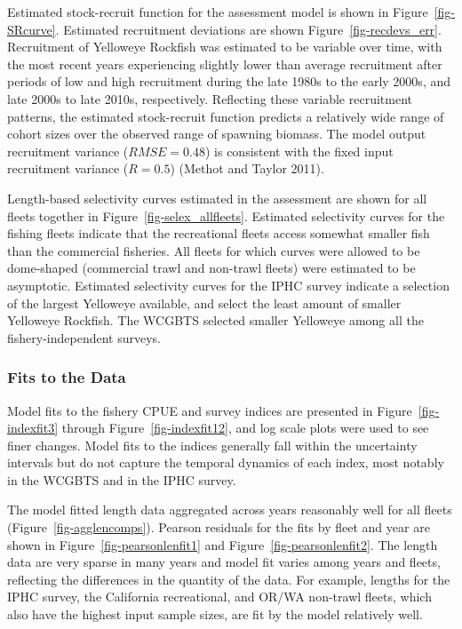 \documentclass[
  english,
]{article}
\begin{document}
Estimated stock-recruit function for the assessment model is shown in
Figure~\ref{fig-SRcurve}. Estimated recruitment deviations are shown
Figure~\ref{fig-recdevs_err}. Recruitment of Yelloweye Rockfish was
estimated to be variable over time, with the most recent years
experiencing slightly lower than average recruitment after periods of
low and high recruitment during the late 1980s to the early 2000s, and
late 2000s to late 2010s, respectively. Reflecting these variable
recruitment patterns, the estimated stock-recruit function predicts a
relatively wide range of cohort sizes over the observed range of
spawning biomass. The model output recruitment variance
(\(RMSE = 0.48\)) is consistent with the fixed input recruitment
variance (\(R = 0.5\)) (Methot and Taylor 2011).

Length-based selectivity curves estimated in the assessment are shown
for all fleets together in Figure~\ref{fig-selex_allfleets}. Estimated
selectivity curves for the fishing fleets indicate that the recreational
fleets access somewhat smaller fish than the commercial fisheries. All
fleets for which curves were allowed to be dome-shaped (commercial trawl
and non-trawl fleets) were estimated to be asymptotic. Estimated
selectivity curves for the IPHC survey indicate a selection of the
largest Yelloweye available, and select the least amount of smaller
Yelloweye Rockfish. The WCGBTS selected smaller Yelloweye among all the
fishery-independent surveys.

\subsubsection{Fits to the Data}\label{sec-fits}

Model fits to the fishery CPUE and survey indices are presented in
Figure~\ref{fig-indexfit3} through Figure~\ref{fig-indexfit12}, and log
scale plots were used to see finer changes. Model fits to the indices
generally fall within the uncertainty intervals but do not capture the
temporal dynamics of each index, most notably in the WCGBTS and in the
IPHC survey.

The model fitted length data aggregated across years reasonably well for
all fleets (Figure~\ref{fig-agglencomps}). Pearson residuals for the
fits by fleet and year are shown in Figure~\ref{fig-pearsonlenfit1} and
Figure~\ref{fig-pearsonlenfit2}. The length data are very sparse in many
years and model fit varies among years and fleets, reflecting the
differences in the quantity of the data. For example, lengths for the
IPHC survey, the California recreational, and OR/WA non-trawl fleets,
which also have the highest input sample sizes, are fit by the model
relatively well.
\end{document}
